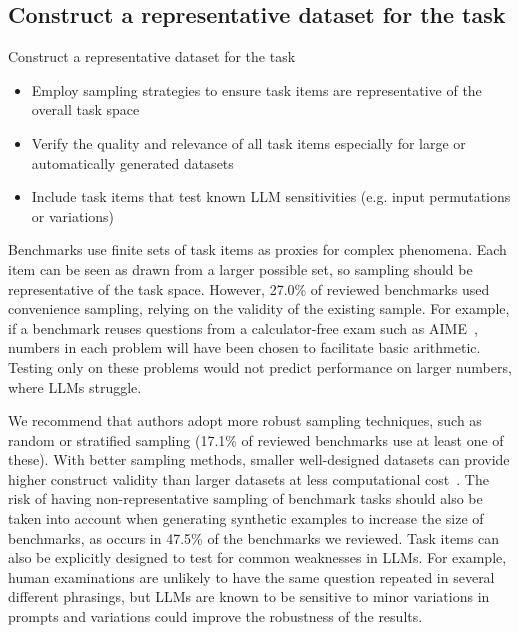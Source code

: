 \subsection{Construct a representative dataset for the task}
\begin{checklistbox}{Construct a representative dataset for the task}
    \begin{itemize}[leftmargin=5pt, label=\scriptsize$\square$]
 \item Employ sampling strategies to ensure task items are representative of the overall task space
 \item Verify the quality and relevance of all task items especially for large or automatically generated datasets
 \item Include task items that test known LLM sensitivities (e.g. input permutations or variations)
\end{itemize}
\end{checklistbox}

Benchmarks use finite sets of task items as proxies for complex phenomena. Each item can be seen as drawn from a larger possible set, so sampling should be representative of the task space. However, 27.0\% of reviewed benchmarks used convenience sampling, relying on the validity of the existing sample. For example, if a benchmark reuses questions from a calculator-free exam such as AIME~\cite{whiteLiveBenchChallengingContaminationLimited2025}, numbers in each problem will have been chosen to facilitate basic arithmetic. Testing only on these problems would not predict performance on larger numbers, where LLMs struggle.

We recommend that authors adopt more robust sampling techniques, such as random or stratified sampling (17.1\% of reviewed benchmarks use at least one of these). With better sampling methods, smaller well-designed datasets can provide higher construct validity than larger datasets at less computational cost~\cite{maiapoloTinyBenchmarksEvaluatingLLMs2024}. The risk of having non-representative sampling of benchmark tasks should also be taken into account when generating synthetic examples to increase the size of benchmarks, as occurs in 47.5\% of the benchmarks we reviewed. Task items can also be explicitly designed to test for common weaknesses in LLMs. For example, human examinations are unlikely to have the same question repeated in several different phrasings, but LLMs are known to be sensitive to minor variations in prompts \cite{zhuoProSAAssessingUnderstanding2024, mizrahiStateWhatArt2024} and variations could improve the robustness of the results.

